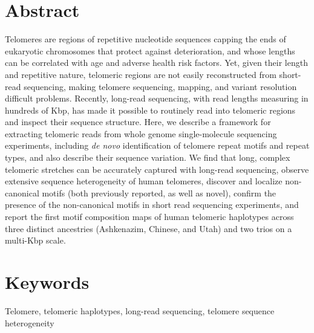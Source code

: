 \documentclass{article}
\begin{document}
\section*{Abstract} 
    Telomeres are regions of repetitive nucleotide sequences capping the ends of eukaryotic chromosomes that protect against deterioration,
        and whose lengths can be correlated with age and adverse health risk factors.
    Yet, given their length and repetitive nature,
        telomeric regions are not easily reconstructed from short-read sequencing,
        making telomere sequencing, mapping, and variant resolution difficult problems.
    Recently, long-read sequencing, with read lengths measuring in hundreds of Kbp,
        has made it possible to routinely read into telomeric regions and inspect their sequence structure.
    Here, we describe a framework for
        extracting telomeric reads from whole genome single-molecule sequencing experiments,
        including \textit{de novo} identification of telomere repeat motifs and repeat types,
        and also describe their sequence variation.
    We find that
        long, complex telomeric stretches can be accurately captured with long-read sequencing,
        observe extensive sequence heterogeneity of human telomeres,
        discover and localize non-canonical motifs (both previously reported, as well as novel),
        confirm the presence of the non-canonical motifs in short read sequencing experiments,
        and report the first motif composition maps of human telomeric haplotypes across three distinct ancestries
            (Ashkenazim, Chinese, and Utah) and two trios on a multi-Kbp scale.

\section*{Keywords} 
    Telomere, telomeric haplotypes, long-read sequencing, telomere sequence heterogeneity

\pagebreak
\doublespacing
\end{document}
